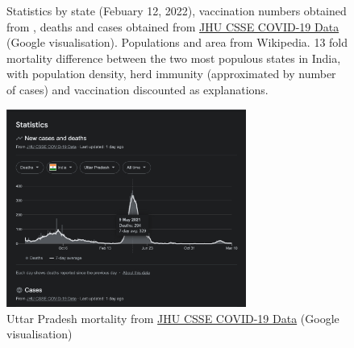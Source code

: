 \documentclass[11pt,a4paper,notitlepage]{report}
\begin{document}

\begin{figure}[h]
    \centering
    \caption{Statistics by state (Febuary 12, 2022), vaccination numbers obtained from \cite{statistaIndiaVaccination}, deaths and cases obtained from \href{https://github.com/CSSEGISandData/COVID-19}{JHU CSSE COVID-19 Data} (Google visualisation). Populations and area from Wikipedia. 13 fold mortality difference between the two most populous states in India, with population density, herd immunity (approximated by number of cases) and vaccination discounted as explanations.}
    \label{fig:india-stats}
\end{figure}

\begin{figure}[h]
    \centering
    \includegraphics[width=0.7\textwidth]{india-uttarpradesh-mortality}
    \caption{Uttar Pradesh mortality from \href{https://github.com/CSSEGISandData/COVID-19}{JHU CSSE COVID-19 Data} (Google visualisation)}
    \label{fig:india-uttarpradesh-mortality}
\end{figure}
\end{document}
